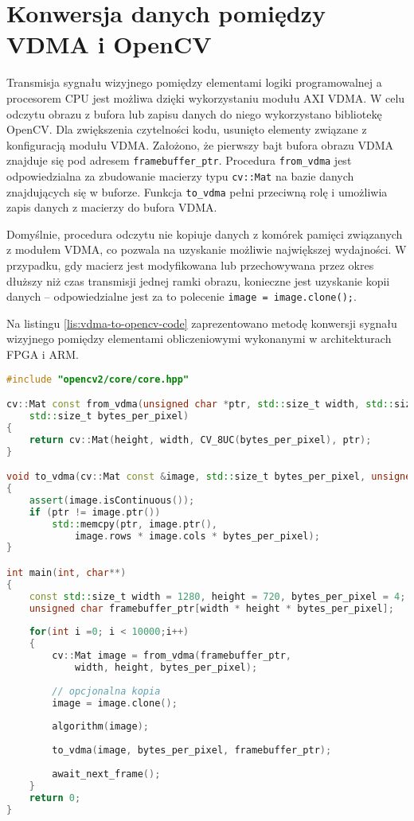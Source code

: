 \section{Konwersja danych pomiędzy VDMA i OpenCV}
\label{sec:vdma-to-opencv}

Transmisja sygnału wizyjnego pomiędzy elementami logiki programowalnej a procesorem CPU jest możliwa dzięki wykorzystaniu modułu AXI VDMA. 
W celu odczytu obrazu z bufora lub zapisu danych do niego wykorzystano bibliotekę OpenCV. 
Dla zwiększenia czytelności kodu, usunięto elementy związane z konfiguracją modułu VDMA. 
Założono, że pierwszy bajt bufora obrazu VDMA znajduje się pod adresem \texttt{framebuffer\_ptr}. 
Procedura \texttt{from\_vdma} jest odpowiedzialna za zbudowanie macierzy typu \texttt{cv::Mat} na bazie danych znajdujących się w buforze. 
Funkcja \texttt{to\_vdma} pełni przeciwną rolę i umożliwia zapis danych z macierzy do bufora VDMA.

Domyślnie, procedura odczytu nie kopiuje danych z komórek pamięci związanych z modułem VDMA, co pozwala na uzyskanie możliwie największej wydajności. 
W przypadku, gdy macierz jest modyfikowana lub przechowywana przez okres dłuższy niż czas transmisji jednej ramki obrazu, konieczne jest uzyskanie kopii danych -- odpowiedzialne jest za to polecenie \texttt{image = image.clone();}.

Na listingu \ref{lis:vdma-to-opencv-code} zaprezentowano metodę konwersji sygnału wizyjnego pomiędzy elementami obliczeniowymi wykonanymi w architekturach FPGA i ARM.



\begin{lstlisting}[language=C++, label=lis:vdma-to-opencv-code, caption=Konwersja sygnału wizyjnego pomiędzy AXI VDMA i \texttt{cv::Mat}.]
#include "opencv2/core/core.hpp"

cv::Mat const from_vdma(unsigned char *ptr, std::size_t width, std::size_t height,
	std::size_t bytes_per_pixel)
{
	return cv::Mat(height, width, CV_8UC(bytes_per_pixel), ptr);
}

void to_vdma(cv::Mat const &image, std::size_t bytes_per_pixel, unsigned char *ptr)
{
	assert(image.isContinuous());
	if (ptr != image.ptr())
		std::memcpy(ptr, image.ptr(),
			image.rows * image.cols * bytes_per_pixel);
}

int main(int, char**)
{
	const std::size_t width = 1280, height = 720, bytes_per_pixel = 4;
	unsigned char framebuffer_ptr[width * height * bytes_per_pixel];
	
	for(int i =0; i < 10000;i++)
	{
		cv::Mat image = from_vdma(framebuffer_ptr,
			width, height, bytes_per_pixel);
		
		// opcjonalna kopia
		image = image.clone();
		
		algorithm(image);
		
		to_vdma(image, bytes_per_pixel, framebuffer_ptr);
		
		await_next_frame();
	}
	return 0;
}

\end{lstlisting}